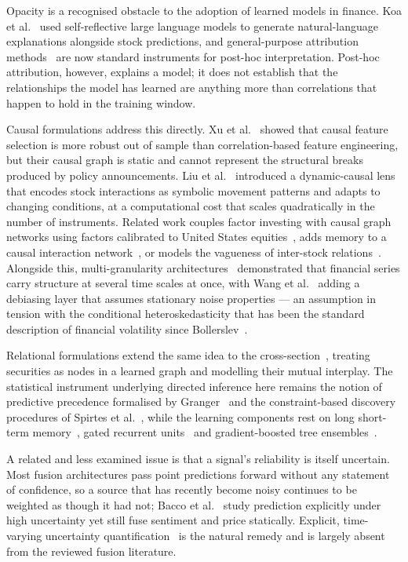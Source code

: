 Opacity is a recognised obstacle to the adoption of learned models in finance. Koa et
al.~\cite{koa2024} used self-reflective large language models to generate natural-language
explanations alongside stock predictions, and general-purpose attribution
methods~\cite{lundberg2017,ribeiro2016} are now standard instruments for post-hoc
interpretation. Post-hoc attribution, however, explains a model; it does not establish that the
relationships the model has learned are anything more than correlations that happen to hold in
the training window.

Causal formulations address this directly. Xu et al.~\cite{xu2026causal} showed that causal
feature selection is more robust out of sample than correlation-based feature engineering, but
their causal graph is static and cannot represent the structural breaks produced by policy
announcements. Liu et al.~\cite{liu2026dynamic} introduced a dynamic-causal lens that encodes
stock interactions as symbolic movement patterns and adapts to changing conditions, at a
computational cost that scales quadratically in the number of instruments. Related work couples
factor investing with causal graph networks using factors calibrated to United States
equities~\cite{yu2025causalseqgnn}, adds memory to a causal interaction
network~\cite{luo2025magicnet}, or models the vagueness of inter-stock
relations~\cite{xing2024vague}. Alongside this, multi-granularity
architectures~\cite{zhu2025multigran,wang2025mtmd} demonstrated that financial series carry
structure at several time scales at once, with Wang et al.~\cite{wang2025mtmd} adding a
debiasing layer that assumes stationary noise properties --- an assumption in tension with the
conditional heteroskedasticity that has been the standard description of financial volatility
since Bollerslev~\cite{bollerslev1986}.

Relational formulations extend the same idea to the
cross-section~\cite{patel2024hybrid,liu2024heterogeneous,gao2025relational}, treating
securities as nodes in a learned graph and modelling their mutual interplay. The statistical
instrument underlying directed inference here remains the notion of predictive precedence
formalised by Granger~\cite{granger1969} and the constraint-based discovery procedures of
Spirtes et al.~\cite{spirtes2000}, while the learning components rest on long short-term
memory~\cite{hochreiter1997}, gated recurrent units~\cite{cho2014gru} and gradient-boosted
tree ensembles~\cite{chen2016xgboost}.

A related and less examined issue is that a signal's reliability is itself uncertain. Most
fusion architectures pass point predictions forward without any statement of confidence, so a
source that has recently become noisy continues to be weighted as though it had not; Bacco et
al.~\cite{bacco2024} study prediction explicitly under high uncertainty yet still fuse sentiment
and price statically. Explicit, time-varying uncertainty
quantification~\cite{gal2016dropout,kendall2017} is the natural remedy and is largely absent
from the reviewed fusion literature.

